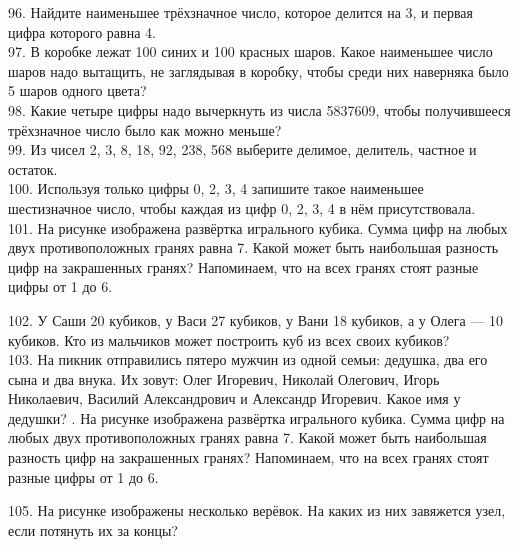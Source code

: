 96. Найдите наименьшее трёхзначное число, которое делится на 3, и первая цифра которого равна 4.\\
97. В коробке лежат 100 синих и 100 красных шаров. Какое наименьшее число шаров надо вытащить, не заглядывая в коробку, чтобы среди них наверняка было 5 шаров одного цвета?\\
98. Какие четыре цифры надо вычеркнуть из числа 5837609, чтобы получившееся трёхзначное число было как можно меньше?\\
99. Из чисел 2, 3, 8, 18, 92, 238, 568 выберите делимое, делитель, частное и остаток.\\
100. Используя только цифры 0, 2, 3, 4 запишите такое наименьшее шестизначное число, чтобы каждая из цифр 0, 2, 3, 4 в нём присутствовала.\\
101. На рисунке изображена развёртка игрального кубика. Сумма цифр на любых двух противоположных гранях равна 7. Какой может быть наибольшая разность цифр на закрашенных гранях? Напоминаем, что на всех гранях стоят разные цифры от 1 до 6.
\begin{center}
\begin{figure}[ht!]
\end{figure}
\end{center}
102. У Саши 20 кубиков, у Васи 27 кубиков, у Вани 18 кубиков, а у Олега --- 10 кубиков. Кто из мальчиков может построить куб из всех своих кубиков?\\
103. На пикник отправились пятеро мужчин из одной семьи: дедушка, два его сына и два внука. Их зовут: Олег Игоревич, Николай Олегович, Игорь Николаевич, Василий Александрович и Александр Игоревич. Какое имя у дедушки?\newpage
{}. На рисунке изображена развёртка игрального кубика. Сумма цифр на любых двух противоположных гранях равна 7. Какой может быть наибольшая разность цифр на закрашенных гранях? Напоминаем, что на всех гранях стоят разные цифры от 1 до 6.
\begin{center}
\begin{figure}[ht!]
\end{figure}
\end{center}
105. На рисунке изображены несколько верёвок. На каких из них завяжется узел, если потянуть их за концы?
\begin{center}
\begin{figure}[ht!]
\end{figure}
\end{center}
